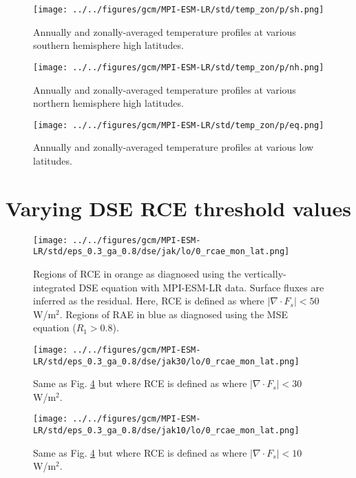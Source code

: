 \documentclass[11pt]{article}
\begin{document}
\begin{figure}[htbp]
\centering
\texttt{[image: ../../figures/gcm/MPI-ESM-LR/std/temp\_zon/p/sh.png]}
\caption{\label{fig:orgcec0283}Annually and zonally-averaged temperature profiles at various southern hemisphere high latitudes.}
\end{figure}

\begin{figure}[htbp]
\centering
\texttt{[image: ../../figures/gcm/MPI-ESM-LR/std/temp\_zon/p/nh.png]}
\caption{\label{fig:org1543f05}Annually and zonally-averaged temperature profiles at various northern hemisphere high latitudes.}
\end{figure}

\begin{figure}[htbp]
\centering
\texttt{[image: ../../figures/gcm/MPI-ESM-LR/std/temp\_zon/p/eq.png]}
\caption{\label{fig:orgbe9e717}Annually and zonally-averaged temperature profiles at various low latitudes.}
\end{figure}


\section{Varying DSE RCE threshold values}
\label{sec:org8cb184c}

\begin{figure}[htbp]
\centering
\texttt{[image: ../../figures/gcm/MPI-ESM-LR/std/eps\_0.3\_ga\_0.8/dse/jak/lo/0\_rcae\_mon\_lat.png]}
\caption{\label{fig:org1fcf752}Regions of RCE in orange as diagnosed using the vertically-integrated DSE equation with MPI-ESM-LR data. Surface fluxes are inferred as the residual. Here, RCE is defined as where \(|\nabla\cdot F_s| < 50\) W/m\(^2\). Regions of RAE in blue as diagnosed using the MSE equation (\(R_1>0.8\)).}
\end{figure}

\begin{figure}[htbp]
\centering
\texttt{[image: ../../figures/gcm/MPI-ESM-LR/std/eps\_0.3\_ga\_0.8/dse/jak30/lo/0\_rcae\_mon\_lat.png]}
\caption{\label{fig:org6dc45a1}Same as Fig. \ref{fig:org1fcf752} but where RCE is defined as where \(|\nabla\cdot F_s| < 30\) W/m\(^2\).}
\end{figure}

\begin{figure}[htbp]
\centering
\texttt{[image: ../../figures/gcm/MPI-ESM-LR/std/eps\_0.3\_ga\_0.8/dse/jak10/lo/0\_rcae\_mon\_lat.png]}
\caption{\label{fig:org864d3b9}Same as Fig. \ref{fig:org1fcf752} but where RCE is defined as where \(|\nabla\cdot F_s| < 10\) W/m\(^2\).}
\end{figure}
\end{document}
